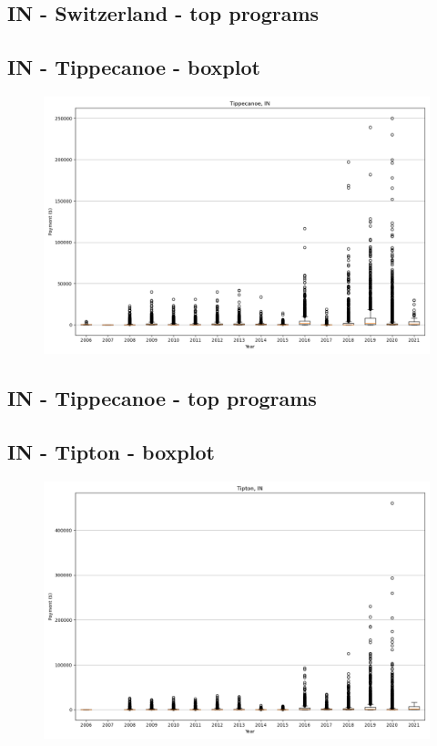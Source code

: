 \subsection*{IN - Switzerland - top programs}

\newpage
\subsection*{IN - Tippecanoe - boxplot}
\begin{figure}[h]
\centering
\includegraphics[width=7in]{../output/boxplots/counties/Tippecanoe-IN_boxplot.png}
\end{figure}


\subsection*{IN - Tippecanoe - top programs}

\newpage
\subsection*{IN - Tipton - boxplot}
\begin{figure}[h]
\centering
\includegraphics[width=7in]{../output/boxplots/counties/Tipton-IN_boxplot.png}
\end{figure}



